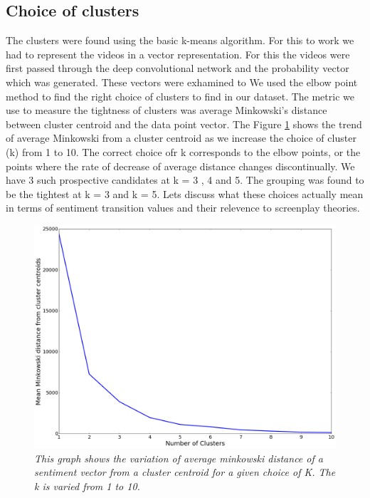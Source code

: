 \subsection{Choice of clusters}
The clusters were found using the basic k-means algorithm. For this to work we had to represent the videos in a vector representation. For this the videos were first passed through the deep convolutional network and the probability vector which was generated. These vectors were exhamined to  We used the elbow point method to find the right choice of clusters to find in our dataset. The metric we use to measure the tightness of clusters was average Minkowski's distance between cluster centroid and the data point vector. 
The Figure \ref{fig:elbow_points} shows the trend of average Minkowski from a cluster centroid as we increase the choice of cluster (k) from 1 to 10. The correct choice ofr k corresponds to the elbow points, or the points where the rate of decrease of average distance changes discontinually. We have 3 such prospective candidates at k = 3 , 4 and 5.
The grouping was found to be the tightest at k = 3 and k = 5.
Lets discuss what these choices actually mean in terms of sentiment transition values and their relevence to screenplay theories. 
\begin{figure}
\centering
\includegraphics[width=\columnwidth]{plots/grouping_graph_clusters}
\caption{\textsl{This graph shows the variation of average minkowski distance of a sentiment vector from a cluster centroid for a given choice of K. The k is varied from 1 to 10.}}
\label{fig:elbow_points}
\end{figure}


